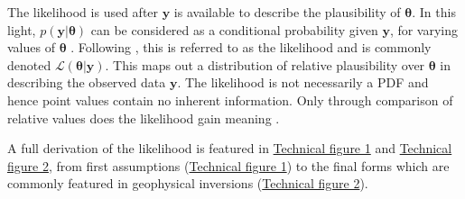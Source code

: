 The likelihood is used after $\bm{y}$ is available to describe the plausibility of $\bm{\theta}$. In this light, $p(\bm{y}|\bm{\theta})$ can be considered as a conditional probability given $\bm{y}$, for varying values of $\bm{\theta}$ \citep[p.10]{Box1973}. Following \citet{Fisher1922}, this is referred to as the likelihood and is commonly denoted $\mathcal{L}(\bm{\theta}|\bm{y})$. This maps out a distribution of relative plausibility over $\bm{\theta}$ in describing the observed data $\bm{y}$. The likelihood is not necessarily a PDF and hence point values contain no inherent information. Only through comparison of relative values does the likelihood gain meaning \citep[p.11]{Box1973}.\par


A full derivation of the likelihood is featured in \hyperref[tf1]{Technical figure 1} and \hyperref[tf1]{Technical figure 2}, from first assumptions (\hyperref[tf1]{Technical figure 1}) to the final forms which are commonly featured in geophysical inversions (\hyperref[tf1]{Technical figure 2}).\par

